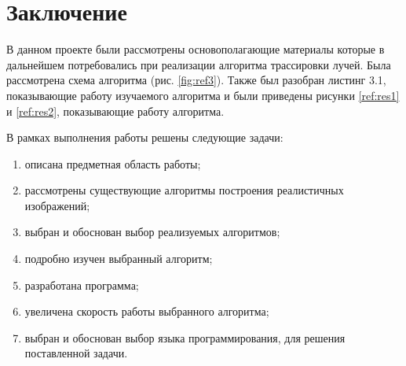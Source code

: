 \chapter*{Заключение}

В данном проекте были рассмотрены
основополагающие материалы которые в дальнейшем потребовались
при реализации алгоритма трассировки лучей.
Была рассмотрена схема алгоритма (рис. \ref{fig:ref3}).
Также был разобран листинг 3.1,
показывающие работу изучаемого алгоритма
и были приведены рисунки \ref{ref:res1} и \ref{ref:res2},
показывающие работу алгоритма.

В рамках выполнения работы решены следующие задачи:

\begin{enumerate}
	\item описана предметная область работы;
	\item рассмотрены существующие алгоритмы построения реалистичных изображений;
	\item выбран и обоснован выбор реализуемых алгоритмов;
	\item подробно изучен выбранный алгоритм;
	\item разработана программа;
	\item увеличена скорость работы выбранного алгоритма;
	\item выбран и обоснован выбор языка программирования, для решения поставленной задачи.
\end{enumerate}

